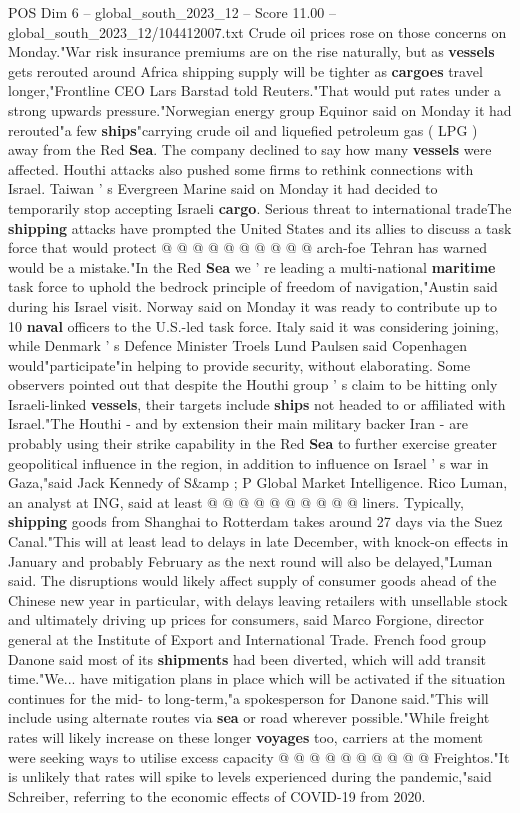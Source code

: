 \begin{textsample}{POS Dim 6 – global\_south\_2023\_12 – Score 11.00 – global\_south\_2023\_12/104412007.txt}
Crude oil prices rose on those concerns on Monday."War risk insurance premiums are on the rise naturally, but as \textbf{vessels} gets rerouted around Africa shipping supply will be tighter as \textbf{cargoes} travel longer,"Frontline CEO Lars Barstad told Reuters."That would put rates under a strong upwards pressure."Norwegian energy group Equinor said on Monday it had rerouted"a few \textbf{ships}"carrying crude oil and liquefied petroleum gas ( LPG ) away from the Red \textbf{Sea}.
The company declined to say how many \textbf{vessels} were affected.
Houthi attacks also pushed some firms to rethink connections with Israel.
Taiwan ' s Evergreen Marine said on Monday it had decided to temporarily stop accepting Israeli \textbf{cargo}.
Serious threat to international tradeThe \textbf{shipping} attacks have prompted the United States and its allies to discuss a task force that would protect @ @ @ @ @ @ @ @ @ @ arch-foe Tehran has warned would be a mistake."In the Red \textbf{Sea} we ' re leading a multi-national \textbf{maritime} task force to uphold the bedrock principle of freedom of navigation,"Austin said during his Israel visit.
Norway said on Monday it was ready to contribute up to 10 \textbf{naval} officers to the U.S.-led task force.
Italy said it was considering joining, while Denmark ' s Defence Minister Troels Lund Paulsen said Copenhagen would"participate"in helping to provide security, without elaborating.
Some observers pointed out that despite the Houthi group ' s claim to be hitting only Israeli-linked \textbf{vessels}, their targets include \textbf{ships} not headed to or affiliated with Israel."The Houthi - and by extension their main military backer Iran - are probably using their strike capability in the Red \textbf{Sea} to further exercise greater geopolitical influence in the region, in addition to influence on Israel ' s war in Gaza,"said Jack Kennedy of S\&amp ; P Global Market Intelligence.
Rico Luman, an analyst at ING, said at least @ @ @ @ @ @ @ @ @ @ liners.
Typically, \textbf{shipping} goods from Shanghai to Rotterdam takes around 27 days via the Suez Canal."This will at least lead to delays in late December, with knock-on effects in January and probably February as the next round will also be delayed,"Luman said.
The disruptions would likely affect supply of consumer goods ahead of the Chinese new year in particular, with delays leaving retailers with unsellable stock and ultimately driving up prices for consumers, said Marco Forgione, director general at the Institute of Export and International Trade.
French food group Danone said most of its \textbf{shipments} had been diverted, which will add transit time."We... have mitigation plans in place which will be activated if the situation continues for the mid- to long-term,"a spokesperson for Danone said."This will include using alternate routes via \textbf{sea} or road wherever possible."While freight rates will likely increase on these longer \textbf{voyages} too, carriers at the moment were seeking ways to utilise excess capacity @ @ @ @ @ @ @ @ @ @ Freightos."It is unlikely that rates will spike to levels experienced during the pandemic,"said Schreiber, referring to the economic effects of COVID-19 from 2020.

\end{textsample}

